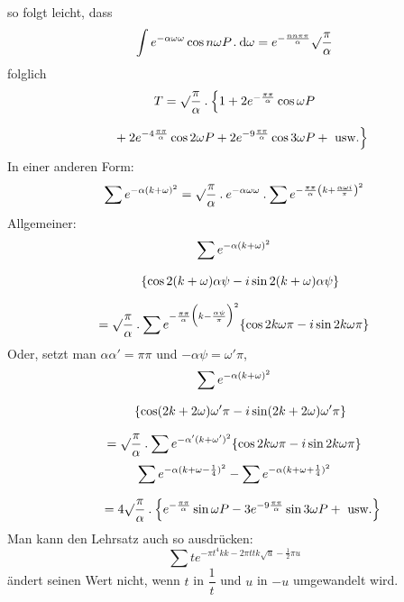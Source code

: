 so folgt leicht, dass
\[
\int e^{-\alpha\omega\omega}\cos n\omega P\mathbin{.}\mathrm{d}\omega
=e^{-\frac{nn\pi\pi}{\alpha}}\surd\frac{\pi}{\alpha}
\]
folglich
\[
\begin{gathered}T=\surd\frac{\pi}{\alpha}\mathbin{.}
\Bigl\{1+2e^{-\frac{\pi\pi}{\alpha}}\cos\omega P
\\[7pt]\quad{}+2e^{-4\frac{\pi\pi}{\alpha}}\cos2\omega P
+2e^{-9\frac{\pi\pi}{\alpha}}\cos3\omega P+\text{ usw.}\Bigr\}\end{gathered}
\]
In einer anderen Form:
\[
\sum e^{-\alpha(k+\omega)^2}
=\surd\frac{\pi}{\alpha}\mathbin{.}e^{-\alpha\omega\omega}\mathbin{.}
\sum e^{-\frac{\pi\pi}{\alpha}\left(k+\frac{\alpha\omega i}{\pi}\right)^2}
\]
Allgemeiner:
\[
\begin{gathered}
\sum e^{-\alpha(k+\omega)^2}\\[7pt]\quad{}\{\cos2(k+\omega)\alpha\psi-i\sin2(k+\omega)\alpha\psi\}\\[7pt]
=\surd\frac{\pi}{\alpha}\mathbin{.}
\sum e^{-\frac{\pi\pi}{\alpha}\Bigl(k-\frac{\alpha\psi}{\pi}\Bigr)^2}
\{\cos2k\omega\pi-i\sin2k\omega\pi\}
\end{gathered}
\]
Oder, setzt man $\alpha\alpha'=\pi\pi$ und $-\alpha\psi=\omega'\pi$,
\[
\begin{gathered}
\sum e^{-\alpha(k+\omega)^2}\\[7pt]\quad{}\{\cos(2k+2\omega)\omega'\pi-i\sin(2k+2\omega)\omega'\pi\}\\[7pt]
=\surd\frac{\pi}{\alpha}\mathbin{.}\sum e^{-\alpha'(k+\omega')^2}
\{\cos2k\omega\pi-i\sin2k\omega\pi\}
\end{gathered}
\]
\[
\begin{gathered}\sum e^{-\alpha(k+\omega-\frac14)^2}-\sum e^{-\alpha(k+\omega+\frac14)^2}
\\[7pt]\quad{}=4\surd\frac{\pi}{\alpha}\mathbin{.}
\Bigl\{e^{-\frac{\pi\pi}{\alpha}}\sin\omega P
-3e^{-9\frac{\pi\pi}{\alpha}}\sin3\omega P+\text{ usw.}\Bigr\}\end{gathered}
\]
Man kann den Lehrsatz auch so ausdrücken:
\[
\sum t e^{-\pi t^{4}kk-2\pi ttk\surd u-\frac12\pi u}
\]
ändert seinen Wert nicht, wenn $t$ in $\dfrac1t$ und $u$ in $-u$ umgewandelt wird.
\clearpage
\endgroup
